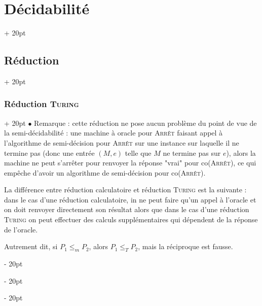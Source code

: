 \documentclass[a4paper, 12pt, twoside]{article}
\renewcommand{\le}{\leqslant}
\newcommand{\ind}[1][20pt]{\advance\leftskip + #1}
\newcommand{\deind}[1][20pt]{\advance\leftskip - #1}
\newenvironment{indt}[2][20pt]{#2 \par \ind[#1]}{\par \deind} %
\begin{document}
\begin{indt}{\section{Décidabilité}}
\begin{indt}{\subsection{Réduction}}
\begin{indt}{\subsubsection{Réduction \textsc{Turing}}}
                $\bullet$ Remarque : cette réduction ne pose aucun problème du point de vue de la semi-décidabilité : une machine à oracle pour \textsc{Arrêt} faisant appel à l'algorithme de semi-décision pour \textsc{Arrêt} sur une instance sur laquelle il ne termine pas (donc une entrée $(M, e)$ telle que $M$ ne termine pas sur $e$), alors la machine ne peut s'arrêter pour renvoyer la réponse "vrai" pour co(\textsc{Arrêt}), ce qui empêche d'avoir un algorithme de semi-décision pour co(\textsc{Arrêt}).

                La différence entre réduction calculatoire et réduction \textsc{Turing} est la suivante : dans le cas d'une réduction calculatoire, in ne peut faire qu'un appel à l'oracle et on doit renvoyer directement son résultat alors que dans le cas d'une réduction \textsc{Turing} on peut effectuer des calculs supplémentaires qui dépendent de la réponse de l'oracle.

                Autrement dit, si $P_1 \le_m P_2$, alors $P_1 \le_T P_2$, mais la réciproque est fausse.
            \end{indt}
        \end{indt}
    \end{indt}

    \vspace{12pt}
    
\end{document}
